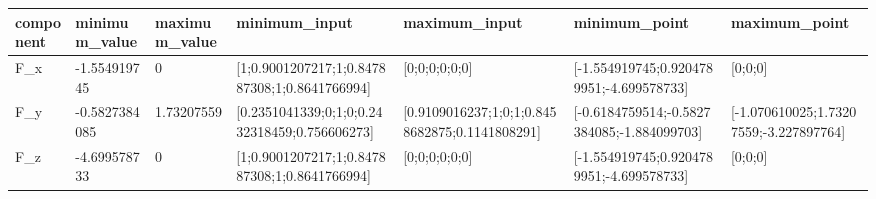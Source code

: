 \begin{tabular}{@{}lllllll@{}}
\toprule
component & minimum\_value & maximum\_value & minimum\_input & maximum\_input & minimum\_point & maximum\_point \\
\midrule
F\_x & -1.554919745 & 0 & [1;0.9001207217;1;0.847887308;1;0.8641766994] & [0;0;0;0;0;0] & [-1.554919745;0.9204789951;-4.699578733] & [0;0;0] \\
F\_y & -0.5827384085 & 1.73207559 & [0.2351041339;0;1;0;0.2432318459;0.756606273] & [0.9109016237;1;0;1;0.8458682875;0.1141808291] & [-0.6184759514;-0.5827384085;-1.884099703] & [-1.070610025;1.73207559;-3.227897764] \\
F\_z & -4.699578733 & 0 & [1;0.9001207217;1;0.847887308;1;0.8641766994] & [0;0;0;0;0;0] & [-1.554919745;0.9204789951;-4.699578733] & [0;0;0] \\
\bottomrule
\end{tabular}
